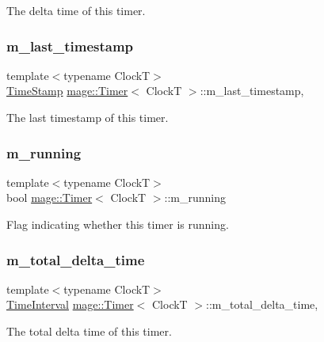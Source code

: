 The delta time of this timer. \hypertarget{classmage_1_1_timer_a01e35b71a5fe5eebe3b05c1b675cb5ce}{}\label{classmage_1_1_timer_a01e35b71a5fe5eebe3b05c1b675cb5ce} 
\subsubsection{\texorpdfstring{m\+\_\+last\+\_\+timestamp}{m\_last\_timestamp}}
{\footnotesize\ttfamily template$<$typename ClockT$>$ \\
\hyperlink{classmage_1_1_timer_abd11aea6107940b09ef3c48f62c81668}{Time\+Stamp} \hyperlink{classmage_1_1_timer}{mage\+::\+Timer}$<$ ClockT $>$\+::m\+\_\+last\+\_\+timestamp\hspace{0.3cm}{\ttfamily [mutable]}, {\ttfamily [private]}}

The last timestamp of this timer. \hypertarget{classmage_1_1_timer_a195789c583eb8bd3b9f0058214b74bc5}{}\label{classmage_1_1_timer_a195789c583eb8bd3b9f0058214b74bc5} 
\subsubsection{\texorpdfstring{m\+\_\+running}{m\_running}}
{\footnotesize\ttfamily template$<$typename ClockT$>$ \\
bool \hyperlink{classmage_1_1_timer}{mage\+::\+Timer}$<$ ClockT $>$\+::m\+\_\+running\hspace{0.3cm}{\ttfamily [private]}}

Flag indicating whether this timer is running. \hypertarget{classmage_1_1_timer_aa62b280ee2b58a3f75440cc4faf10b23}{}\label{classmage_1_1_timer_aa62b280ee2b58a3f75440cc4faf10b23} 
\subsubsection{\texorpdfstring{m\+\_\+total\+\_\+delta\+\_\+time}{m\_total\_delta\_time}}
{\footnotesize\ttfamily template$<$typename ClockT$>$ \\
\hyperlink{classmage_1_1_timer_a5c0fd78ceab0110637622bd0e9b8424d}{Time\+Interval} \hyperlink{classmage_1_1_timer}{mage\+::\+Timer}$<$ ClockT $>$\+::m\+\_\+total\+\_\+delta\+\_\+time\hspace{0.3cm}{\ttfamily [mutable]}, {\ttfamily [private]}}

The total delta time of this timer. 